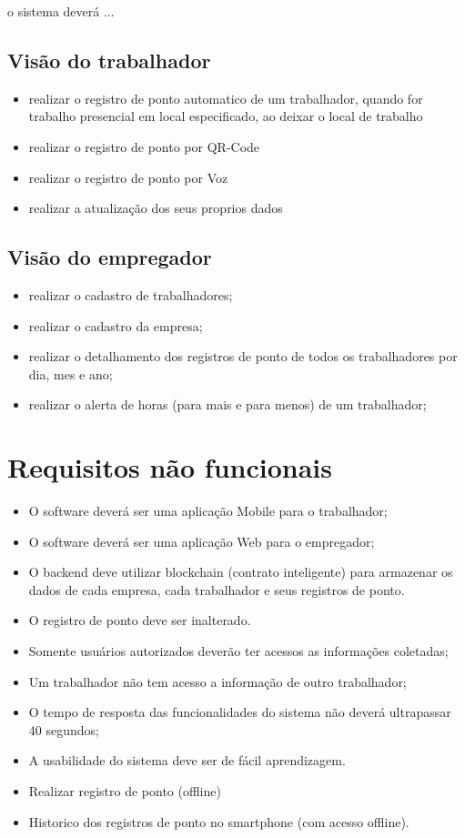 \documentclass[12pt,openright,twoside,a4paper,english, brazil]{abntex2} %
\begin{document}
o sistema deverá ...


\subsection{Visão do trabalhador}

\begin{itemize}
	\item realizar o registro de ponto automatico de um trabalhador, quando for trabalho presencial em local especificado, ao deixar o local de trabalho
	\item realizar o registro de ponto por QR-Code
	\item realizar o registro de ponto por Voz
	\item realizar a atualização dos seus proprios dados
\end{itemize}

\subsection{Visão do empregador}


\begin{itemize}
	\item realizar o cadastro de trabalhadores;
	\item realizar o cadastro da empresa;
	\item realizar o detalhamento dos registros de ponto de todos os trabalhadores por dia, mes e ano;
	\item realizar o alerta de horas (para mais e para menos) de um trabalhador;
\end{itemize}

\section{Requisitos não funcionais}

\begin{itemize}
	\item O software deverá ser uma aplicação Mobile para o trabalhador;
	\item O software deverá ser uma aplicação Web para o empregador;
	\item O backend deve utilizar blockchain (contrato inteligente) para armazenar os dados de cada empresa, cada trabalhador e seus registros de ponto.
	\item O registro de ponto deve ser inalterado.
	\item Somente usuários autorizados deverão ter acessos as informações coletadas;
	\item Um trabalhador não tem acesso a informação de outro trabalhador;
	\item O tempo de resposta das funcionalidades do sistema não deverá ultrapassar 40 segundos;
	\item A usabilidade do sistema deve ser de fácil aprendizagem.
	\item Realizar registro de ponto (offline)
	\item Historico dos registros de ponto no smartphone (com acesso offline).
\end{itemize}
\end{document}
